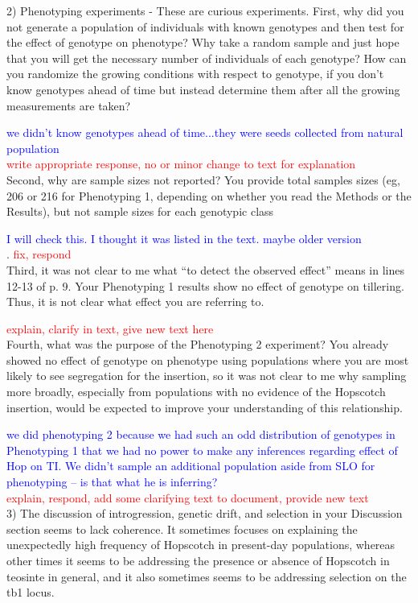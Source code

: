 \documentclass[11pt]{article}
\newcommand{\res}[1]{\noindent \textcolor{blue}{{#1}} \\}
\newcommand{\jri}[1]{\noindent \textcolor{red}{{#1}} \\}
\begin{document}
2) Phenotyping experiments - These are curious experiments.  First, why did you not generate a population of individuals with known genotypes and then test for the effect of genotype on phenotype?  Why take a random sample and just hope that you will get the necessary number of individuals of each genotype?  How can you randomize the growing conditions with respect to genotype, if you don’t know genotypes ahead of time but instead determine them after all the growing measurements are taken? 

\res{we didn't know genotypes ahead of time...they were seeds collected from natural population} 
\jri{write appropriate response, no or minor change to text for explanation}

Second, why are sample sizes not reported?  You provide total samples sizes (eg, 206 or 216 for Phenotyping 1, depending on whether you read the Methods or the Results), but not sample sizes for each genotypic class 

\res{I will check this. I thought it was listed in the text. maybe older version}.  
\jri{fix, respond}

Third, it was not clear to me what “to detect the observed effect” means in lines 12-13 of p. 9.  Your Phenotyping 1 results show no effect of genotype on tillering.  Thus, it is not clear what effect you are referring to.  

\jri{explain, clarify in text, give new text here}

Fourth, what was the purpose of the Phenotyping 2  experiment?  You already showed no effect of genotype on phenotype using populations where you are most likely to see segregation for the insertion, so it was not clear to me why sampling more broadly, especially from populations with no evidence of the Hopscotch insertion, would be expected to improve your understanding of this relationship.

\res{we did phenotyping 2 because we had such an odd distribution of genotypes in Phenotyping 1 that we had no power to make any inferences regarding effect of Hop on TI. We didn't sample an additional population aside from SLO for phenotyping -- is that what he is inferring?} 
\jri{explain, respond, add some clarifying text to document, provide new text}

3) The discussion of introgression, genetic drift, and selection in your Discussion section seems to lack coherence.  It sometimes focuses on explaining the unexpectedly high frequency of Hopscotch in present-day populations, whereas other times it seems to be addressing the presence or absence of Hopscotch in teosinte in general, and it also sometimes seems to be addressing selection on the tb1 locus. 
\end{document}
